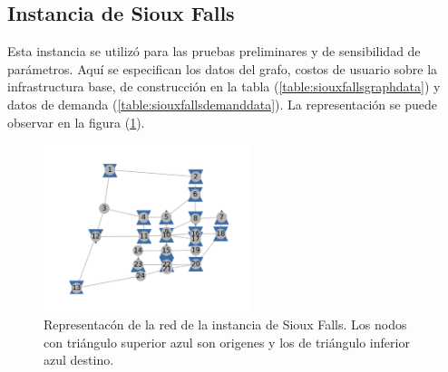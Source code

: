 \documentclass{article}
\begin{document}
  \subsection{Instancia de Sioux Falls}

  Esta instancia se utilizó para las pruebas preliminares y de sensibilidad de parámetros. Aquí se especifican los datos del grafo, costos de usuario sobre la infrastructura base, de construcción en la tabla (\ref{table:siouxfallsgraphdata}) y datos de demanda (\ref{table:siouxfallsdemanddata}). La representación se puede observar en la figura (\ref{fig:siouxfallsapendix}).

  \begin{figure}[h!]
    \centering
    \includegraphics[width=6cm]{../resources/sioux_falls_odpairs.png}
    \caption{Representacón de la red de la instancia de Sioux Falls. Los nodos con triángulo superior azul son origenes y los de triángulo inferior azul destino.}
    \label{fig:siouxfallsapendix}
  \end{figure}
\end{document}
